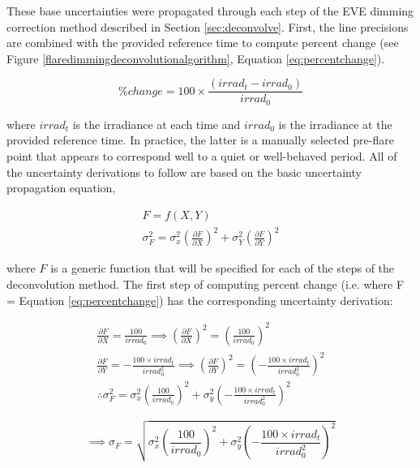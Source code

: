 These base uncertainties were propagated through each step of the EVE dimming correction method described in Section \ref{sec:deconvolve}. First, the line precisions are combined with the provided reference time to compute percent change (see Figure \ref{flaredimmingdeconvolutionalgorithm}, Equation \ref{eq:percentchange}). 

\begin{equation} 
    \% change = 100 \times \frac{(irrad_t - irrad_0)}{irrad_0}
    \label{eq:percentchange}
\end{equation}

\noindent where $irrad_t$ is the irradiance at each time and $irrad_0$ is the irradiance at the provided reference time. In practice, the latter is a manually selected pre-flare point that appears to correspond well to a quiet or well-behaved period. All of the uncertainty derivations to follow are based on the basic uncertainty propagation equation, 

\begin{gather}
    F = f(X,Y) \\
    \sigma^2_F = \sigma^2_x(\frac{\partial F}{\partial X})^2 + \sigma^2_Y(\frac{\partial F}{\partial Y})^2
    \label{eq:genericuncertainty}
\end{gather}

\noindent where $F$ is a generic function that will be specified for each of the steps of the deconvolution method. The first step of computing percent change (i.e. where F = Equation \ref{eq:percentchange}) has the corresponding uncertainty derivation: 

\begin{gather*} 
    \frac{\partial F}{\partial X} = \frac{100}{irrad_0} \implies 
    (\frac{\partial F}{\partial X})^2 = (\frac{100}{irrad_0})^2 \\    
    \frac{\partial F}{\partial Y} = -\frac{100 \times irrad_t}{irrad_0^2} 
    \implies (\frac{\partial F}{\partial Y})^2 = (-\frac{100 \times irrad_t}{irrad_0^2})^2 \\
    \therefore \sigma^2_F = \sigma^2_x(\frac{100}{irrad_0})^2 + \sigma^2_y(-\frac{100 \times irrad_t}{irrad_0^2})^2
    \label{eq:percentchangeuncertaintyderivation}
\end{gather*}

\begin{equation}
    \implies \sigma _F = \sqrt{\sigma^2_x(\frac{100}{irrad_0})^2 + \sigma^2_y(-\frac{100 \times irrad_t}{irrad_0^2})^2}
    \label{eq:percentchangeuncertainty}
\end{equation}


